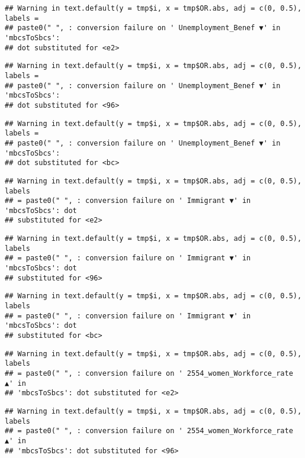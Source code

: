 \documentclass[
]{article}
\begin{document}
\begin{verbatim}
## Warning in text.default(y = tmp$i, x = tmp$OR.abs, adj = c(0, 0.5), labels =
## paste0(" ", : conversion failure on ' Unemployment_Benef ▼' in 'mbcsToSbcs':
## dot substituted for <e2>
\end{verbatim}

\begin{verbatim}
## Warning in text.default(y = tmp$i, x = tmp$OR.abs, adj = c(0, 0.5), labels =
## paste0(" ", : conversion failure on ' Unemployment_Benef ▼' in 'mbcsToSbcs':
## dot substituted for <96>
\end{verbatim}

\begin{verbatim}
## Warning in text.default(y = tmp$i, x = tmp$OR.abs, adj = c(0, 0.5), labels =
## paste0(" ", : conversion failure on ' Unemployment_Benef ▼' in 'mbcsToSbcs':
## dot substituted for <bc>
\end{verbatim}

\begin{verbatim}
## Warning in text.default(y = tmp$i, x = tmp$OR.abs, adj = c(0, 0.5), labels
## = paste0(" ", : conversion failure on ' Immigrant ▼' in 'mbcsToSbcs': dot
## substituted for <e2>
\end{verbatim}

\begin{verbatim}
## Warning in text.default(y = tmp$i, x = tmp$OR.abs, adj = c(0, 0.5), labels
## = paste0(" ", : conversion failure on ' Immigrant ▼' in 'mbcsToSbcs': dot
## substituted for <96>
\end{verbatim}

\begin{verbatim}
## Warning in text.default(y = tmp$i, x = tmp$OR.abs, adj = c(0, 0.5), labels
## = paste0(" ", : conversion failure on ' Immigrant ▼' in 'mbcsToSbcs': dot
## substituted for <bc>
\end{verbatim}

\begin{verbatim}
## Warning in text.default(y = tmp$i, x = tmp$OR.abs, adj = c(0, 0.5), labels
## = paste0(" ", : conversion failure on ' 2554_women_Workforce_rate ▲' in
## 'mbcsToSbcs': dot substituted for <e2>
\end{verbatim}

\begin{verbatim}
## Warning in text.default(y = tmp$i, x = tmp$OR.abs, adj = c(0, 0.5), labels
## = paste0(" ", : conversion failure on ' 2554_women_Workforce_rate ▲' in
## 'mbcsToSbcs': dot substituted for <96>
\end{verbatim}
\end{document}
